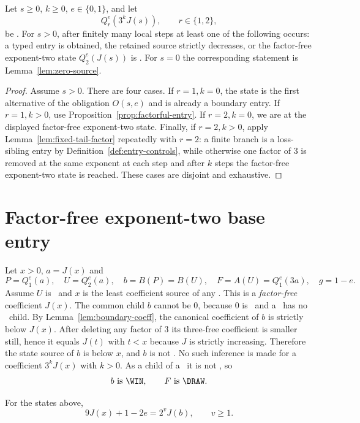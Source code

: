 \begin{proposition}\label{prop:boundary-reduction}
Let $s\ge0$, $k\ge0$, $e\in\{0,1\}$, and let
\[
  Q_r^e(3^kJ(s)),\qquad r\in\{1,2\},
\]
be \DRAW. For $s>0$, after finitely many local steps at least one of the following occurs: a typed entry is obtained, the retained source strictly
decreases, or the factor-free exponent-two state $Q_2^e(J(s))$ is \DRAW.
For $s=0$ the corresponding statement is Lemma~\ref{lem:zero-source}.
\end{proposition}

\begin{proof}
Assume $s>0$. There are four cases. If $r=1,k=0$, the state is the first
alternative of the obligation $O(s,e)$ and is already a boundary entry. If
$r=1,k>0$, use Proposition~\ref{prop:factorful-entry}. If $r=2,k=0$, we are
at the displayed factor-free exponent-two state. Finally, if $r=2,k>0$, apply
Lemma~\ref{lem:fixed-tail-factor} repeatedly with $r=2$: a finite branch is a
loss-sibling entry by Definition~\ref{def:entry-controls}, while otherwise
one factor of $3$ is removed at the same exponent at each step and after $k$
steps the factor-free exponent-two state is reached. These cases are disjoint
and exhaustive.
\end{proof}

\section{Factor-free exponent-two base entry}

Let $x>0$, $a=J(x)$ and
\[
  P=Q_1^e(a),\quad U=Q_2^e(a),\quad
  b=B(P)=B(U),\quad F=A(U)=Q_1^e(3a),\quad g=1-e.
\]
Assume $U$ is \DRAW\ and $x$ is the least coefficient source of any \DRAW.  This is a \emph{factor-free} coefficient $J(x)$.  The common child $b$ cannot be $0$, because $0$ is \LOSS\ and a \DRAW\ has no \LOSS\ child.  By Lemma~\ref{lem:boundary-coeff}, the canonical coefficient of $b$ is strictly below $J(x)$.  After deleting any factor of $3$ its three-free coefficient is smaller still, hence it equals $J(t)$ with $t<x$ because $J$ is strictly increasing.  Therefore the state source of $b$ is below $x$, and $b$ is not \DRAW.  No such inference is made for a coefficient $3^kJ(x)$ with $k>0$.
As a child of a \DRAW\ it is not \LOSS, so
\[
  b\text{ is \WIN},\qquad F\text{ is \DRAW}.
\]
\begin{lemma}\label{lem:first-factor}
For the states above,
\begin{equation}\label{eq:first-factor}
  9J(x)+1-2e=2^vJ(b),\qquad v\ge1.
\end{equation}
\end{lemma}

